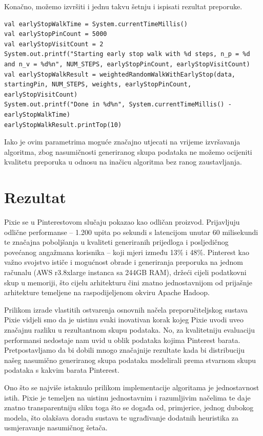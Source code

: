 \documentclass[times, utf8, seminar]{fer}
\begin{document}
Konačno, možemo izvršiti i jednu takvu šetnju i ispisati rezultat preporuke.

\begin{lstlisting}
val earlyStopWalkTime = System.currentTimeMillis()
val earlyStopPinCount = 5000
val earlyStopVisitCount = 2
System.out.printf("Starting early stop walk with %d steps, n_p = %d and n_v = %d%n", NUM_STEPS, earlyStopPinCount, earlyStopVisitCount)
val earlyStopWalkResult = weightedRandomWalkWithEarlyStop(data, startingPin, NUM_STEPS, weights, earlyStopPinCount, earlyStopVisitCount)
System.out.printf("Done in %d%n", System.currentTimeMillis() - earlyStopWalkTime)
earlyStopWalkResult.printTop(10)
\end{lstlisting}

Iako je ovim parametrima moguće značajno utjecati na vrijeme izvršavanja algoritma, zbog nasumičnosti generiranog skupa podataka ne možemo ocijeniti kvalitetu preporuka u odnosu na inačicu algoritma bez ranog zaustavljanja.

\chapter{Rezultat}

Pixie se u Pinterestovom slučaju pokazao kao odličan proizvod. Prijavljuju odlične performanse -- 1.200 upita po sekundi s latencijom unutar 60 milisekundi te značajna poboljšanja u kvaliteti generiranih prijedloga i posljedičnog povećanog angažmana korisnika -- koji mjeri između 13\% i 48\%. Pinterest kao važno svojstvo ističe i mogućnost obrade i generiranja preporuka na jednom računalu (AWS r3.8xlarge instanca sa 244GB RAM), držeći cijeli podatkovni skup u memoriji, što cijelu arhitekturu čini znatno jednostavnijom od prijašnje arhitekture temeljene na raspodijeljenom okviru Apache Hadoop.

Prilikom izrade vlastitih ostvarenja osnovnih načela preporučiteljskog sustava Pixie vidjeli smo da je uistinu svaki inovativan korak kojeg Pixie uvodi uveo značajnu razliku u rezultantnom skupu podataka. No, za kvalitetniju evaluaciju performansi nedostaje nam uvid u oblik podataka kojima Pinterest barata. Pretpostavljamo da bi dobili mnogo značajnije rezultate kada bi distribuciju našeg nasumično generiranog skupa podataka modelirali prema stvarnom skupu podataka s kakvim barata Pinterest.

Ono što se najviše istaknulo prilikom implementacije algoritama je jednostavnost istih. Pixie je temeljen na uistinu jednostavnim i razumljivim načelima te daje znatno transparentniju sliku toga što se događa od, primjerice, jednog dubokog modela, što olakšava doradu sustava te ugrađivanje dodatnih heuristika za usmjeravanje nasumičnog šetača. 
\end{document}
